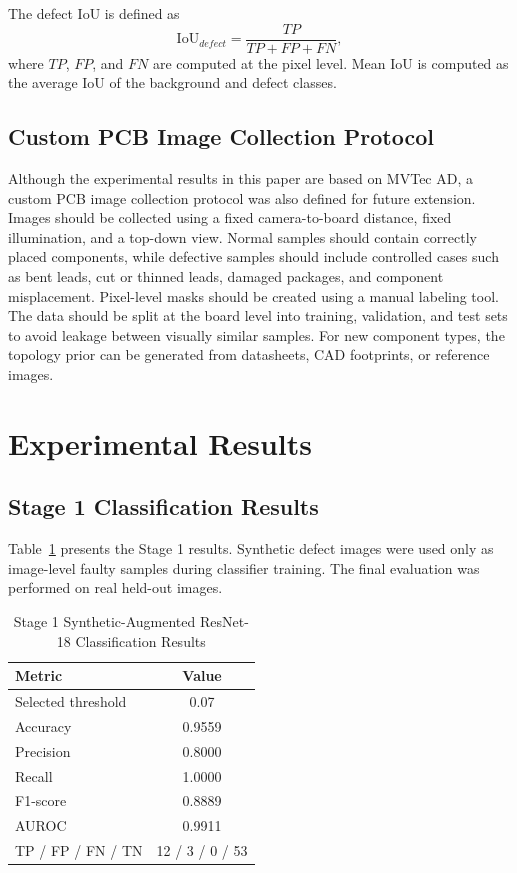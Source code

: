 \documentclass[conference,a4paper]{IEEEtran}
\begin{document}
The defect IoU is defined as
\begin{equation}
\mathrm{IoU}_{defect} = \frac{TP}{TP + FP + FN},
\end{equation}
where $TP$, $FP$, and $FN$ are computed at the pixel level. Mean IoU is computed as the average IoU of the background and defect classes.

\subsection{Custom PCB Image Collection Protocol}

Although the experimental results in this paper are based on MVTec AD, a custom PCB image collection protocol was also defined for future extension. Images should be collected using a fixed camera-to-board distance, fixed illumination, and a top-down view. Normal samples should contain correctly placed components, while defective samples should include controlled cases such as bent leads, cut or thinned leads, damaged packages, and component misplacement. Pixel-level masks should be created using a manual labeling tool. The data should be split at the board level into training, validation, and test sets to avoid leakage between visually similar samples. For new component types, the topology prior can be generated from datasheets, CAD footprints, or reference images.

\section{Experimental Results}

\subsection{Stage 1 Classification Results}

Table~\ref{tab:stage1} presents the Stage 1 results. Synthetic defect images were used only as image-level faulty samples during classifier training. The final evaluation was performed on real held-out images.

\begin{table}[!t]
\centering
\caption{Stage 1 Synthetic-Augmented ResNet-18 Classification Results}
\label{tab:stage1}
\begin{tabular}{lc}
\toprule
Metric & Value \\
\midrule
Selected threshold & 0.07 \\
Accuracy & 0.9559 \\
Precision & 0.8000 \\
Recall & 1.0000 \\
F1-score & 0.8889 \\
AUROC & 0.9911 \\
TP / FP / FN / TN & 12 / 3 / 0 / 53 \\
\bottomrule
\end{tabular}
\end{table}
\end{document}
